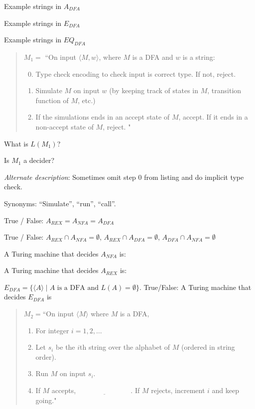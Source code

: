 \documentclass[12pt, oneside]{article}
\begin{document}
    Example strings in $A_{DFA}$
    
    \vfill
    
    Example strings in  $E_{DFA}$
    
    \vfill
    
    Example strings in  $EQ_{DFA}$
    
    \vfill

  
    \newpage

  \begin{quote}
  $M_1 = $ ``On input $\langle M,w\rangle$, where $M$ is a DFA and $w$ is a string:
  \begin{enumerate}
  \setcounter{enumi}{-1}
  \item Type check encoding to check input is correct type. If not, reject.
  \item Simulate $M$ on input $w$ (by keeping track of states in $M$, transition function of $M$, etc.) 
  \item If the simulations ends in an accept state of $M$, accept. If it ends in a non-accept state of $M$, reject. "
  \end{enumerate}
  \end{quote}
  

What is $L(M_1)$? 

\vfill

Is $M_1$ a decider?

\vfill


{\it Alternate description}:
Sometimes omit step 0 from listing and do implicit type check.

Synonyms: ``Simulate'', ``run'', ``call''.

\newpage

  True / False: $A_{REX} = A_{NFA} = A_{DFA}$

  True / False: $A_{REX} \cap A_{NFA} = \emptyset$, $A_{REX} \cap A_{DFA} = \emptyset$, $A_{DFA} \cap A_{NFA} = \emptyset$

  
  A Turing machine that  decides $A_{NFA}$ is: 
  
  \vfill
  
  A Turing machine that  decides $A_{REX}$ is: 
  
  \vfill

  $E_{DFA} = \{ \langle A \rangle \mid  \text{$A$ is a  DFA and  $L(A) = \emptyset$}\}$. 
  True/False: A Turing machine that  decides $E_{DFA}$ is

  \begin{quote}
  $M_2 =  $``On  input  $\langle M\rangle$ where $M$ is a  DFA,
  \begin{enumerate}
  \item For integer  $i = 1, 2, \ldots$
  \item \qquad Let  $s_i$ be the  $i$th string over  the alphabet of  $M$ (ordered in  string order).
  \item \qquad Run $M$ on  input  $s_i$.
  \item \qquad If $M$  accepts,  $\underline{\phantom{FILL  IN BLANK}}$.  If $M$  rejects, increment $i$ and keep going."
  \end{enumerate}
  \end{quote}
  
\end{document}
